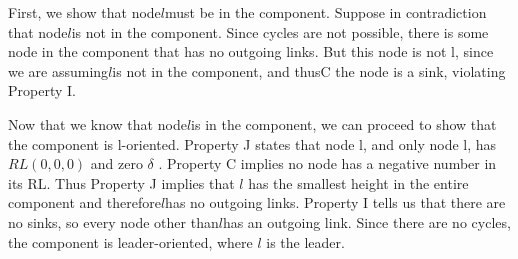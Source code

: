 First, we show that node$ l $must be in the component. Suppose in contradiction that node$ l $is not in the component. Since cycles are not possible, there is some node in the component that has no outgoing links. But this node is not l, since we are assuming$ l $is not in the component, and thusC the node is a sink, violating Property I.

Now that we know that node$ l $is in the component, we can proceed to show that the component is l-oriented. Property J states that node l, and only node l, has $RL (0,0,0)$ and zero $\delta$ . Property C implies no node has a negative number in its RL. Thus Property J implies that $ l $ has the smallest height in the entire component and therefore$ l $has no outgoing links. Property I tells us that there are no sinks, so every node other than$ l $has an outgoing link. Since there are no cycles, the component is leader-oriented, where $ l $ is the leader.
